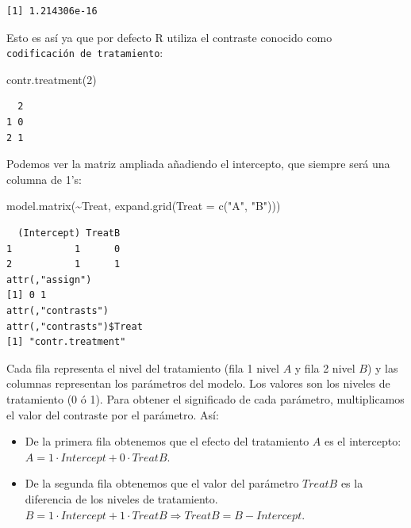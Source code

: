 \documentclass[
  12pt,
  a4paper,
  extrafontsizes,
  onecolumn,
  openright]{memoir}
\newenvironment{Shaded}{\begin{snugshade}}{\end{snugshade}}
\newcommand{\AttributeTok}[1]{\textcolor[rgb]{0.40,0.45,0.13}{#1}}
\newcommand{\DecValTok}[1]{\textcolor[rgb]{0.68,0.00,0.00}{#1}}
\newcommand{\FunctionTok}[1]{\textcolor[rgb]{0.28,0.35,0.67}{#1}}
\newcommand{\NormalTok}[1]{\textcolor[rgb]{0.00,0.23,0.31}{#1}}
\newcommand{\SpecialCharTok}[1]{\textcolor[rgb]{0.37,0.37,0.37}{#1}}
\newcommand{\StringTok}[1]{\textcolor[rgb]{0.13,0.47,0.30}{#1}}
\providecommand{\tightlist}{%
  \setlength{\itemsep}{0pt}\setlength{\parskip}{0pt}}\usepackage{longtable,booktabs,array}
\begin{document}
\begin{verbatim}
[1] 1.214306e-16
\end{verbatim}

\normalsize

Esto es así ya que por defecto R utiliza el contraste conocido como
\texttt{codificación\ de\ tratamiento}:

\scriptsize

\begin{Shaded}
\begin{Highlighting}[]
\FunctionTok{contr.treatment}\NormalTok{(}\DecValTok{2}\NormalTok{)}
\end{Highlighting}
\end{Shaded}

\begin{verbatim}
  2
1 0
2 1
\end{verbatim}

\normalsize

Podemos ver la matriz ampliada añadiendo el intercepto, que siempre será
una columna de 1's:

\scriptsize

\begin{Shaded}
\begin{Highlighting}[]
\FunctionTok{model.matrix}\NormalTok{(}\SpecialCharTok{\textasciitilde{}}\NormalTok{Treat, }\FunctionTok{expand.grid}\NormalTok{(}\AttributeTok{Treat =} \FunctionTok{c}\NormalTok{(}\StringTok{"A"}\NormalTok{, }\StringTok{"B"}\NormalTok{)))}
\end{Highlighting}
\end{Shaded}

\begin{verbatim}
  (Intercept) TreatB
1           1      0
2           1      1
attr(,"assign")
[1] 0 1
attr(,"contrasts")
attr(,"contrasts")$Treat
[1] "contr.treatment"
\end{verbatim}

\normalsize

Cada fila representa el nivel del tratamiento (fila 1 nivel \(A\) y fila
2 nivel \(B\)) y las columnas representan los parámetros del modelo. Los
valores son los niveles de tratamiento (0 ó 1). Para obtener el
significado de cada parámetro, multiplicamos el valor del contraste por
el parámetro. Así:

\begin{itemize}
\tightlist
\item
  De la primera fila obtenemos que el efecto del tratamiento \(A\) es el
  intercepto: \(A = 1 \cdot Intercept + 0 \cdot TreatB\).
\item
  De la segunda fila obtenemos que el valor del parámetro \(TreatB\) es
  la diferencia de los niveles de tratamiento.
  \(B = 1 \cdot Intercept + 1 \cdot TreatB \Rightarrow TreatB = B - Intercept\).
\end{itemize}
\end{document}
